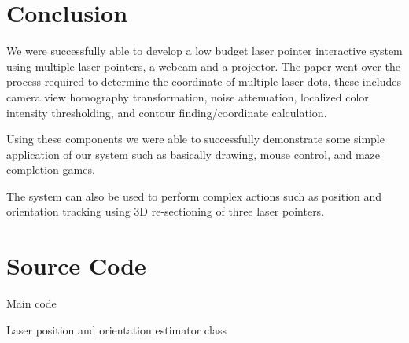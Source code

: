 \documentclass[a4paper]{article}
\begin{document}
\section{Conclusion}
We were successfully able to develop a low budget laser pointer interactive system using multiple laser pointers, a webcam and a projector. The paper went over the process required to determine the coordinate of multiple laser dots, these includes camera view homography transformation, noise attenuation, localized color intensity thresholding, and contour finding/coordinate calculation.

Using these components we were able to successfully demonstrate some simple application of our system such as basically drawing, mouse control, and maze completion games. 

The system can also be used to perform complex actions such as position and orientation tracking using 3D re-sectioning of three laser pointers.

\newpage
\eightpt



\newpage
\onecolumn
\section{Source Code}

Main code

Laser position and orientation estimator class

	
	
\end{document}
